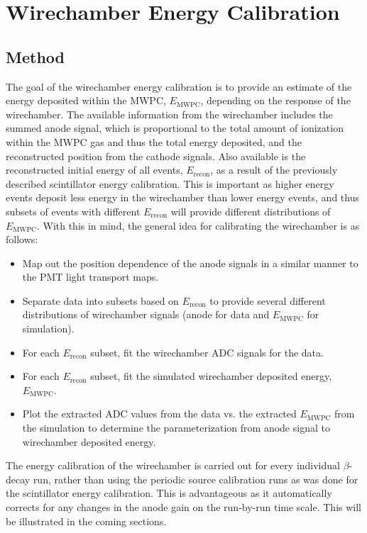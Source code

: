 \section{Wirechamber Energy Calibration}

\subsection{Method}

The goal of the wirechamber energy calibration is to provide an estimate of
the energy deposited within the MWPC, $E_{\mathrm{MWPC}}$, depending on the
response of the wirechamber. The available information from the wirechamber includes the
summed anode signal, which is proportional to the total amount of ionization
within the MWPC gas and thus the total energy deposited, and the reconstructed position from the cathode signals.
Also available is the reconstructed initial energy of all events, $E_{\mathrm{recon}}$, as a result of the
previously described scintillator energy calibration. This is important as higher energy events deposit
less energy in the wirechamber than lower energy events, and thus subsets of events with
different $E_{\mathrm{recon}}$ will provide different distributions of $E_{\mathrm{MWPC}}$.
With this in mind, the general idea for calibrating the wirechamber is as follows:

\begin{itemize}
\item Map out the position dependence of the anode signals in a similar manner to the
  PMT light transport maps.
\item Separate data into subsets based on $E_{\mathrm{recon}}$
  to provide several different distributions of wirechamber signals (anode for data and $E_{\mathrm{MWPC}}$
  for simulation).
\item For each $E_{\mathrm{recon}}$ subset, fit the wirechamber ADC signals for the data.
\item For each $E_{\mathrm{recon}}$ subset, fit the simulated wirechamber deposited energy, $E_{\mathrm{MWPC}}$.
\item Plot the extracted ADC values from the data vs. the extracted $E_{\mathrm{MWPC}}$ from the simulation to
  determine the parameterization from anode signal to wirechamber deposited energy.
\end{itemize}

The energy calibration of the wirechamber is carried out for every individual $\beta$-decay run,
rather than using the periodic
source calibration runs as was done for the scintillator energy calibration. This is advantageous as
it automatically corrects for any changes in the anode gain on the run-by-run time scale. This will
be illustrated in the coming sections.


